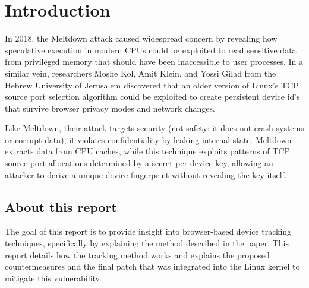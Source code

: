 \documentclass{report}
\begin{document}
\fontsize{8pt}{9pt}\selectfont
{}



\tableofcontents
\thispagestyle{empty}
\clearpage
\pagestyle{plain}

\listoffigures

\clearpage
{}
\pagestyle{default}

\chapter{Introduction}
\label{sec:introduction}

In 2018, the \alert{Meltdown} attack caused widespread concern by revealing how speculative execution in modern CPUs could be exploited to read sensitive data from privileged memory that should have been inaccessible to user processes. In a similar vein, researchers Moshe Kol, Amit Klein, and Yossi Gilad from the Hebrew University of Jerusalem discovered that an older version of Linux’s TCP source port selection algorithm could be exploited to create persistent device id's that survive browser privacy modes and network changes. %

Like Meltdown, their attack targets \alert{security} (not safety: it does not crash systems or corrupt data), it violates confidentiality by leaking internal state. Meltdown extracts data from CPU caches, while this technique exploits patterns of TCP source port allocations determined by a secret per-device key, allowing an attacker to derive a unique \alert{device fingerprint} without revealing the key itself.

\section{About this report}
\label{sec:goal_of_this_report}

The goal of this report is to provide insight into \alert{browser-based device tracking techniques}, specifically by explaining the method described in the paper\cite{kol2022devicetrackinglinuxsnew}. This report details \alert{how} the tracking method \alert{works} and explains the \alert{proposed countermeasures} and the \alert{final patch} that was integrated into the Linux kernel to mitigate this vulnerability.
\end{document}
